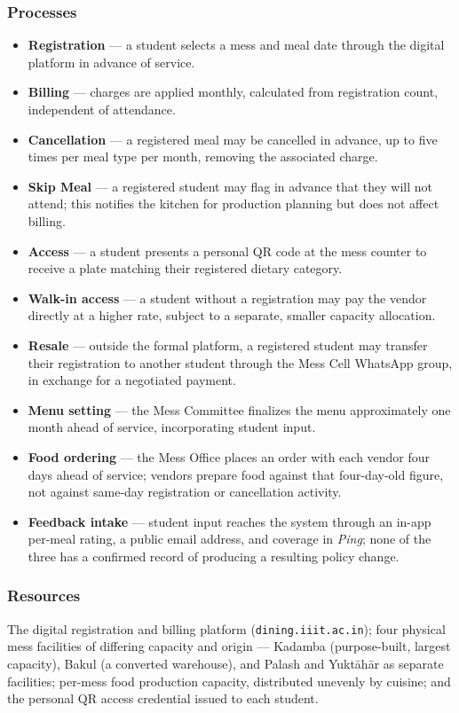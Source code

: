 \documentclass[11pt]{article}
\begin{document}
\subsubsection*{Processes}
\begin{itemize}
    \item \textbf{Registration} --- a student selects a mess and meal date through the
        digital platform in advance of service.
    \item \textbf{Billing} --- charges are applied monthly, calculated from
        registration count, independent of attendance.
    \item \textbf{Cancellation} --- a registered meal may be cancelled in advance, up
        to five times per meal type per month, removing the associated charge.
    \item \textbf{Skip Meal} --- a registered student may flag in advance that they
        will not attend; this notifies the kitchen for production planning but does
        not affect billing.
    \item \textbf{Access} --- a student presents a personal QR code at the mess
        counter to receive a plate matching their registered dietary category.
    \item \textbf{Walk-in access} --- a student without a registration may pay the
        vendor directly at a higher rate, subject to a separate, smaller capacity
        allocation.
    \item \textbf{Resale} --- outside the formal platform, a registered student may
        transfer their registration to another student through the Mess Cell
        WhatsApp group, in exchange for a negotiated payment.
    \item \textbf{Menu setting} --- the Mess Committee finalizes the menu
        approximately one month ahead of service, incorporating student input.
    \item \textbf{Food ordering} --- the Mess Office places an order with each vendor
        four days ahead of service; vendors prepare food against that four-day-old
        figure, not against same-day registration or cancellation activity.
    \item \textbf{Feedback intake} --- student input reaches the system through an
        in-app per-meal rating, a public email address, and coverage in \emph{Ping};
        none of the three has a confirmed record of producing a resulting policy
        change.
\end{itemize}

\subsubsection*{Resources}
The digital registration and billing platform (\texttt{dining.iiit.ac.in}); four
physical mess facilities of differing capacity and origin --- Kadamba (purpose-built,
largest capacity), Bakul (a converted warehouse), and Palash and Yukt\={a}h\={a}r as
separate facilities; per-mess food production capacity, distributed unevenly by
cuisine; and the personal QR access credential issued to each student.
\end{document}
